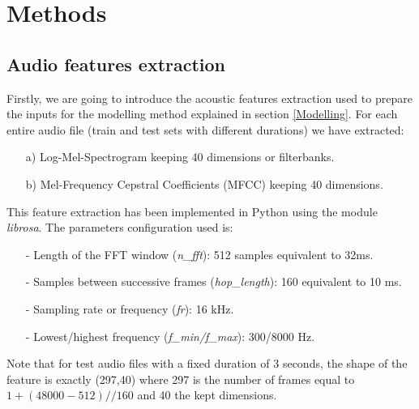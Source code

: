 \documentclass[12pt]{extarticle}
\begin{document}
\section{Methods} \label{Methods}

\subsection{Audio features extraction}

\noindent Firstly, we are going to introduce the acoustic features extraction used to prepare the inputs for the modelling method explained in section \ref{Modelling}. For each entire audio file (train and test sets with different durations) we have extracted:

\begin{itemize}
    \item[a)] Log-Mel-Spectrogram keeping 40 dimensions or filterbanks.
    \item[b)] Mel-Frequency Cepstral Coefficients (MFCC) keeping 40 dimensions.
\end{itemize}

\noindent This feature extraction has been implemented in Python using the module \textit{librosa}. The parameters configuration used is:

\begin{itemize}
    \item[-] Length of the FFT window (\textit{n\_fft}): 512 samples equivalent to 32ms.
    \item[-] Samples between successive frames (\textit{hop\_length}): 160 equivalent to 10 ms.
    \item[-] Sampling rate or frequency (\textit{fr}): 16 kHz.
    \item[-] Lowest/highest frequency (\textit{f\_min/f\_max}): 300/8000 Hz.
\end{itemize}

\noindent Note that for test audio files with a fixed duration of 3 seconds, the shape of the feature is exactly (297,40) where 297 is the number of frames equal to $1+(48000-512)//160$ and 40 the kept dimensions.
\end{document}
